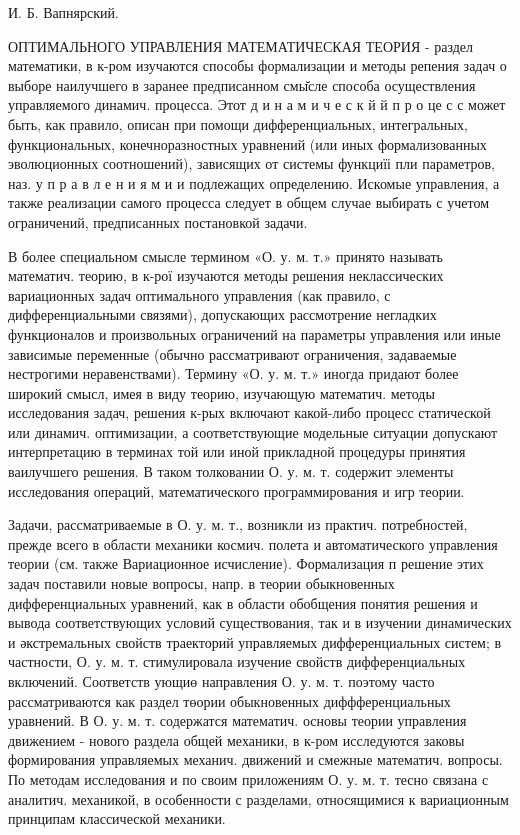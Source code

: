 \documentclass[10pt]{article}
\begin{document}
И. Б. Вапнярский.



ОПТИМАЛЬНОГО УПРАВЛЕНИЯ МАТЕМАТИЧЕСКАЯ ТЕОРИЯ - раздел математики, в к-ром изучаются способы формализации и методы репения задач о выборе наилучшего в заранее предписанном смы̆сле способа осуществления управляемого динамич. процесса. Этот д и н а м и ч е с к й й п р о це с с может быть, как правило, описан при помощи дифференциальных, интегральных, функциональных, конечноразностных уравнений (или иных формализованных эволюционных соотношений), зависящих от системы функциїі пли параметров, наз. у п р а в л е н и я м и и подлежащих определению. Искомые управления, а также реализации самого процесса следует в общем случае выбирать с учетом ограничений, предписанных постановкой задачи.



В более специальном смысле термином «О. у. м. т.» принято называть математич. теорию, в к-рої изучаются методы решения неклассических вариационных задач оптимального управления (как правило, с дифференциальными связями), допускающих рассмотрение негладких функционалов и произвольных ограничений на параметры управления или иные зависимые переменные (обычно рассматривают ограничения, задаваемые нестрогими неравенствами). Термину «О. у. м. т.» иногда придают более широкий смысл, имея в виду теорию, изучающую математич. методы исследования задач, решения к-рых включают какой-либо процесс статической или динамич. оптимизации, а соответствующие модельные ситуации допускают интерпретацию в терминах той или иной прикладной процедуры принятия ваилучшего решения. В таком толковании О. у. м. т. содержит элементы исследования операций, математического программирования и игр теории.



Задачи, рассматриваемые в О. у. м. т., возникли из практич. потребностей, прежде всего в области механики космич. полета и автоматического управления теории (см. также Вариационное исчисление). Формализация п решение этих задач поставили новые вопросы, напр. в теории обыкновенных дифференциальных уравнений, как в области обобщения понятия решения и вывода соответствующих условий существования, так и в изучении динамических и әкстремальных свойств траекторий управляемых дифференциальных систем; в частности, О. у. м. т. стимулировала изучение свойств дифференциальных включений. Соответств ующиө направления О. у. м. т. поэтому часто рассматриваются как раздел төории обыкновенных диффференциальных уравнений. В О. у. м. т. содержатся математич. основы теории управления движением - нового раздела общей механики, в к-ром исследуются заковы формирования управляемых механич. движений и смежные математич. вопросы. По методам исследования и по своим приложениям О. у. м. т. тесно связана с аналитич. механикой, в особенности с разделами, относящимися к вариационным принципам классической механики.
\end{document}
